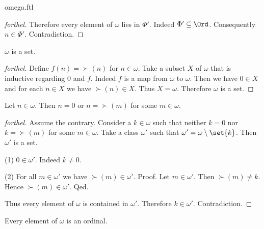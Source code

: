 \documentclass{naproche-library}
\begin{document}
\begin{smodule}{omega.ftl}
\begin{proof}[forthel]
    Therefore every element of $\omega$ lies in $\Phi'$.
    Indeed $\Phi' \subseteq \Ord$.
    Consequently $n \in \Phi'$.
    Contradiction.
  \end{proof}

  \begin{corollary}[forthel,id=SET_THEORY_03_4847727433220096]
    $\omega$ is a set.
  \end{corollary}
  \begin{proof}[forthel]
    Define $f(n) = \succ(n)$ for $n \in \omega$.
    Take a subset $X$ of $\omega$ that is inductive regarding $0$ and $f$.
    Indeed $f$ is a map from $\omega$ to $\omega$.
    Then we have $0 \in X$ and for each $n \in X$ we have $\succ(n) \in X$.
    Thus $X = \omega$.
    Therefore $\omega$ is a set.
  \end{proof}

  \begin{proposition}[forthel,id=SET_THEORY_03_5885789275684864]
    Let $n \in \omega$.
    Then $n = 0$ or $n = \succ(m)$ for some $m \in \omega$.
  \end{proposition}
  \begin{proof}[forthel]
    Assume the contrary.
    Consider a $k \in \omega$ such that neither $k = 0$ nor $k = \succ(m)$ for
    some $m \in \omega$.
    Take a class $\omega'$ such that $\omega' = \omega \setminus \set{k}$. %
    Then $\omega'$ is a set.

    (1) $0 \in \omega'$.
    Indeed $k \neq 0$.

    (2) For all $m \in \omega'$ we have $\succ(m) \in \omega'$. \newline
    Proof.
      Let $m \in \omega'$.
      Then $\succ(m) \neq k$.
      Hence $\succ(m) \in \omega'$.
    Qed.

    Thus every element of $\omega$ is contained in $\omega'$.
    Therefore $k \in \omega'$.
    Contradiction.
  \end{proof}

  \begin{proposition}[forthel,id=SET_THEORY_03_5057540872208384]
    Every element of $\omega$ is an ordinal.
  \end{proposition}
\end{smodule}
\end{document}
